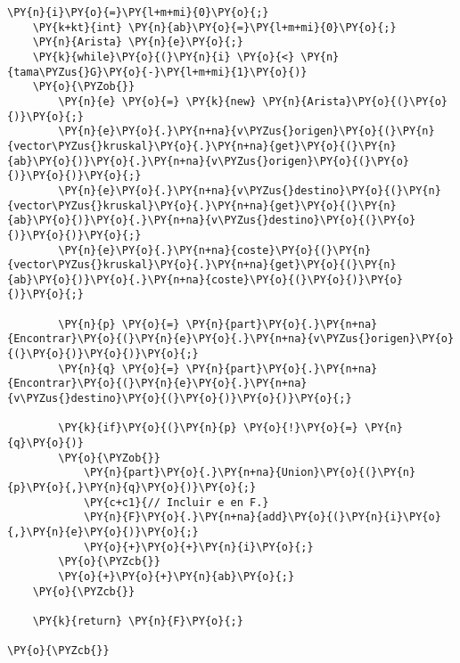 \begin{Verbatim}[commandchars=\\\{\}]
    \PY{n}{i}\PY{o}{=}\PY{l+m+mi}{0}\PY{o}{;}
    \PY{k+kt}{int} \PY{n}{ab}\PY{o}{=}\PY{l+m+mi}{0}\PY{o}{;}
    \PY{n}{Arista} \PY{n}{e}\PY{o}{;}
    \PY{k}{while}\PY{o}{(}\PY{n}{i} \PY{o}{<} \PY{n}{tama\PYZus{}G}\PY{o}{-}\PY{l+m+mi}{1}\PY{o}{)}
	\PY{o}{\PYZob{}}
	    \PY{n}{e} \PY{o}{=} \PY{k}{new} \PY{n}{Arista}\PY{o}{(}\PY{o}{)}\PY{o}{;}
	    \PY{n}{e}\PY{o}{.}\PY{n+na}{v\PYZus{}origen}\PY{o}{(}\PY{n}{vector\PYZus{}kruskal}\PY{o}{.}\PY{n+na}{get}\PY{o}{(}\PY{n}{ab}\PY{o}{)}\PY{o}{.}\PY{n+na}{v\PYZus{}origen}\PY{o}{(}\PY{o}{)}\PY{o}{)}\PY{o}{;}
	    \PY{n}{e}\PY{o}{.}\PY{n+na}{v\PYZus{}destino}\PY{o}{(}\PY{n}{vector\PYZus{}kruskal}\PY{o}{.}\PY{n+na}{get}\PY{o}{(}\PY{n}{ab}\PY{o}{)}\PY{o}{.}\PY{n+na}{v\PYZus{}destino}\PY{o}{(}\PY{o}{)}\PY{o}{)}\PY{o}{;}
	    \PY{n}{e}\PY{o}{.}\PY{n+na}{coste}\PY{o}{(}\PY{n}{vector\PYZus{}kruskal}\PY{o}{.}\PY{n+na}{get}\PY{o}{(}\PY{n}{ab}\PY{o}{)}\PY{o}{.}\PY{n+na}{coste}\PY{o}{(}\PY{o}{)}\PY{o}{)}\PY{o}{;}

	    \PY{n}{p} \PY{o}{=} \PY{n}{part}\PY{o}{.}\PY{n+na}{Encontrar}\PY{o}{(}\PY{n}{e}\PY{o}{.}\PY{n+na}{v\PYZus{}origen}\PY{o}{(}\PY{o}{)}\PY{o}{)}\PY{o}{;}
	    \PY{n}{q} \PY{o}{=} \PY{n}{part}\PY{o}{.}\PY{n+na}{Encontrar}\PY{o}{(}\PY{n}{e}\PY{o}{.}\PY{n+na}{v\PYZus{}destino}\PY{o}{(}\PY{o}{)}\PY{o}{)}\PY{o}{;}

	    \PY{k}{if}\PY{o}{(}\PY{n}{p} \PY{o}{!}\PY{o}{=} \PY{n}{q}\PY{o}{)}
		\PY{o}{\PYZob{}}
		    \PY{n}{part}\PY{o}{.}\PY{n+na}{Union}\PY{o}{(}\PY{n}{p}\PY{o}{,}\PY{n}{q}\PY{o}{)}\PY{o}{;}
		    \PY{c+c1}{// Incluir e en F.}
		    \PY{n}{F}\PY{o}{.}\PY{n+na}{add}\PY{o}{(}\PY{n}{i}\PY{o}{,}\PY{n}{e}\PY{o}{)}\PY{o}{;}
		    \PY{o}{+}\PY{o}{+}\PY{n}{i}\PY{o}{;}
		\PY{o}{\PYZcb{}}
	    \PY{o}{+}\PY{o}{+}\PY{n}{ab}\PY{o}{;}
	\PY{o}{\PYZcb{}}
		
    \PY{k}{return} \PY{n}{F}\PY{o}{;}
	
\PY{o}{\PYZcb{}}
\end{Verbatim}
